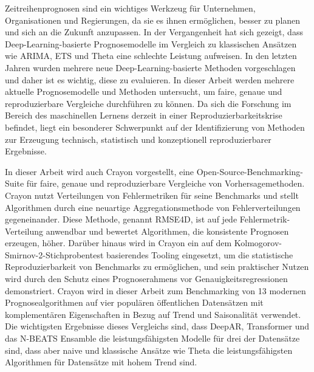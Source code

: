 Zeitreihenprognosen sind ein wichtiges Werkzeug für Unternehmen, Organisationen und Regierungen, da sie es ihnen ermöglichen, besser zu planen und sich an die Zukunft anzupassen. In der Vergangenheit hat sich gezeigt, dass Deep-Learning-basierte Prognosemodelle im Vergleich zu klassischen Ansätzen wie ARIMA, ETS und Theta eine schlechte Leistung aufweisen. In den letzten Jahren wurden mehrere neue Deep-Learning-basierte Methoden vorgeschlagen und daher ist es wichtig, diese zu evaluieren. In dieser Arbeit werden mehrere aktuelle Prognosemodelle und Methoden untersucht, um faire, genaue und reproduzierbare Vergleiche durchführen zu können. Da sich die Forschung im Bereich des maschinellen Lernens derzeit in einer Reproduzierbarkeitskrise befindet, liegt ein besonderer Schwerpunkt auf der Identifizierung von Methoden zur Erzeugung technisch, statistisch und konzeptionell reproduzierbarer Ergebnisse.

In dieser Arbeit wird auch Crayon vorgestellt, eine Open-Source-Benchmarking-Suite für faire, genaue und reproduzierbare Vergleiche von Vorhersagemethoden. Crayon nutzt Verteilungen von Fehlermetriken für seine Benchmarks und stellt Algorithmen durch eine neuartige Aggregationsmethode von Fehlerverteilungen gegeneinander. Diese Methode, genannt RMSE4D, ist auf jede Fehlermetrik-Verteilung anwendbar und bewertet Algorithmen, die konsistente Prognosen erzeugen, höher. Darüber hinaus wird in Crayon ein auf dem Kolmogorov-Smirnov-2-Stichprobentest basierendes Tooling eingesetzt, um die statistische Reproduzierbarkeit von Benchmarks zu ermöglichen, und sein praktischer Nutzen wird durch den Schutz eines Prognoserahmens vor Genauigkeitsregressionen demonstriert. Crayon wird in dieser Arbeit zum Benchmarking von 13 modernen Prognosealgorithmen auf vier populären öffentlichen Datensätzen mit komplementären Eigenschaften in Bezug auf Trend und Saisonalität verwendet. Die wichtigsten Ergebnisse dieses Vergleichs sind, dass DeepAR, Transformer und das N-BEATS Ensamble die leistungsfähigsten Modelle für drei der Datensätze sind, dass aber naive und klassische Ansätze wie Theta die leistungsfähigsten Algorithmen für Datensätze mit hohem Trend sind.